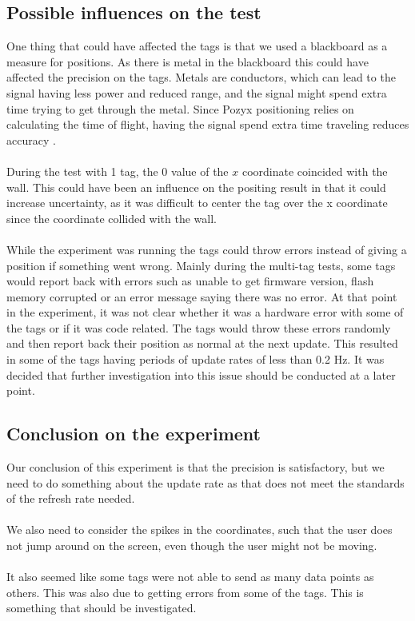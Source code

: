\subsection{Possible influences on the test}
One thing that could have affected the tags is that we used a blackboard as a measure for positions. 
As there is metal in the blackboard this could have affected the precision on the tags.
Metals are conductors, which can lead to the signal having less power and reduced range, and the signal might spend extra time trying to get through the metal.
Since Pozyx positioning relies on calculating the time of flight, having the signal spend extra time traveling reduces accuracy \cite{pozyx-UWBObstacles}. 
\\\\
During the test with 1 tag, the 0 value of the $x$ coordinate coincided with the wall. 
This could have been an influence on the positing result in that it could increase uncertainty, as it was difficult to center the tag over the x coordinate since the coordinate collided with the wall.
\\\\
While the experiment was running the tags could throw errors instead of giving a position if something went wrong.
Mainly during the multi-tag tests, some tags would report back with errors such as unable to get firmware version, flash memory corrupted or an error message saying there was no error.
At that point in the experiment, it was not clear whether it was a hardware error with some of the tags or if it was code related.
The tags would throw these errors randomly and then report back their position as normal at the next update.
This resulted in some of the tags having periods of update rates of less than 0.2 Hz.
It was decided that further investigation into this issue should be conducted at a later point.

\subsection{Conclusion on the experiment}
Our conclusion of this experiment is that the precision is satisfactory, but we need to do something about the update rate as that does not meet the standards of the refresh rate needed.
\\\\
We also need to consider the spikes in the coordinates, such that the user does not jump around on the screen, even though the user might not be moving.
\\\\
It also seemed like some tags were not able to send as many data points as others. This was also due to getting errors from some of the tags.
This is something that should be investigated.

